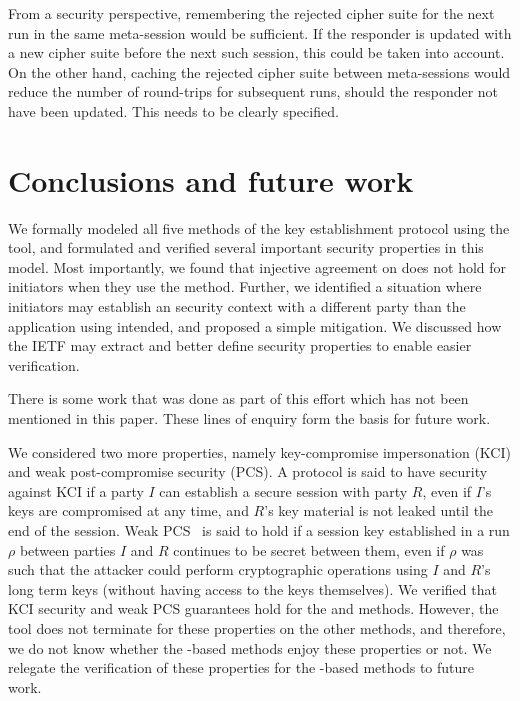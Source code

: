 \documentclass[runningheads, envcountsame, a4paper, draft, x11names]{llncs}
\begin{document}
From a security perspective, remembering the rejected cipher suite for the
next \mEdhoc{} run in the same meta-session would be sufficient.
%
If the responder is updated with a new cipher suite before the next such
session, this could be taken into account. On the other hand, caching the
rejected cipher suite between meta-sessions would reduce the number of
round-trips for subsequent runs, should the responder not have been updated.
%
This needs to be clearly specified.

\section{Conclusions and future work}
\label{sec:conclusions}
We formally modeled all five
methods of the \mEdhoc{} key establishment protocol using the \mTamarin{} tool, and 
%
formulated and verified several important security properties in this model.
%
%
Most importantly, we found that injective agreement on \mGiy{} does not hold for
initiators when they use the \mStat{} method.
%
Further, we identified a situation where initiators may establish an \mOscore{}
security context with a different party than the application using \mEdhoc{}
intended, and proposed a simple mitigation.
%
We discussed how the IETF may extract and better define security properties to
enable easier verification.
%

There is some work that was done as part of this effort which has not been mentioned in this paper. These lines of enquiry form the basis for future work.

We considered two more properties, namely key-compromise impersonation (KCI) and weak post-compromise security (PCS). A protocol is said to have security against KCI if a party $I$ can establish a secure session with party $R$, even if $I$'s keys are compromised at any time, and $R$'s key material is not leaked until the end of the session. Weak PCS~\cite{cohn2016post} is said to hold if a session key established in a run $\rho$ between parties $I$ and $R$ continues to be secret between them, even if $\rho$ was such that the attacker could perform cryptographic operations using $I$ and $R$'s long term keys (without having access to the keys themselves). We verified that KCI security and weak PCS guarantees hold for the \mSigSig{} and \mPskPsk{} methods. However, the tool does not terminate for these properties on the other methods, and therefore, we do not know whether the \mStat-based methods enjoy these properties or not. We relegate the verification of these properties for the \mStat-based methods to future work. 
\end{document}
